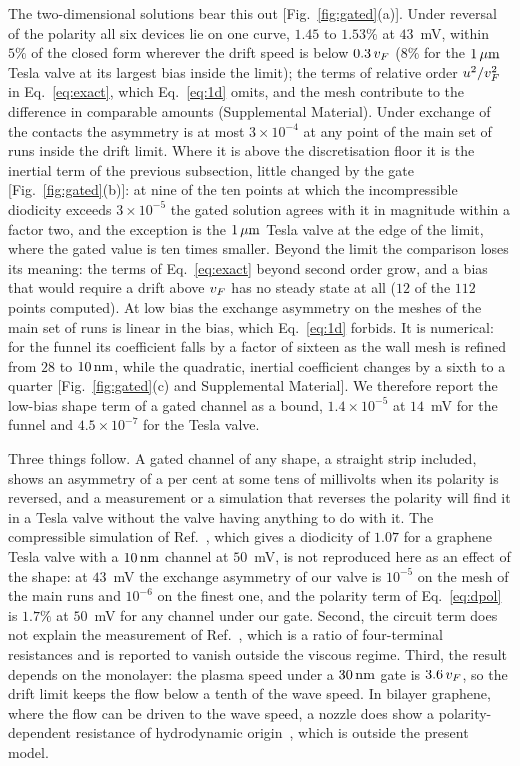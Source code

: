 The two-dimensional solutions bear this out
[Fig.~\ref{fig:gated}(a)]. Under reversal of the polarity all six devices
lie on one curve, $1.45$ to $1.53\%$ at $43$~mV, within $5\%$ of the closed form
wherever the drift speed is below $0.3\,v_{F}$ ($8\%$ for the $1\,\mu\mathrm{m}$ Tesla
valve at its largest bias inside the limit); the terms of relative order
$u^{2}/v_{F}^{2}$ in Eq.~\eqref{eq:exact}, which Eq.~\eqref{eq:1d} omits, and
the mesh contribute to the difference in comparable amounts (Supplemental
Material). Under exchange of the
contacts the asymmetry is at most $3\times10^{-4}$ at any point of the main set of runs
inside the drift limit. Where it is above the discretisation
floor it is the
inertial term of the previous subsection, little changed by the gate
[Fig.~\ref{fig:gated}(b)]: at nine of the ten
points at which the
incompressible diodicity exceeds $3\times10^{-5}$ the gated solution agrees with
it in magnitude within a factor two, and the exception is the $1\,\mu\mathrm{m}$ Tesla valve at the edge of the
limit, where the gated value is ten times smaller. Beyond the limit the
comparison loses its meaning: the terms of Eq.~\eqref{eq:exact} beyond
second order grow, and a bias that would require a drift above $v_{F}$ has no
steady state at all ($12$ of the $112$ points computed). At low bias the exchange asymmetry on the meshes of the main set of runs is
linear in the bias, which Eq.~\eqref{eq:1d} forbids. It is numerical: for
the funnel its coefficient falls by a factor of sixteen as the wall mesh
is refined from $28$ to $10\,\mathrm{nm}$, while the quadratic, inertial coefficient
changes by a sixth to a quarter [Fig.~\ref{fig:gated}(c) and Supplemental
Material]. We therefore report the low-bias
shape term of a gated channel as a bound, $1.4\times10^{-5}$ at $14$~mV for
the funnel and $4.5\times10^{-7}$ for the Tesla valve.

Three things follow. A gated channel of any shape, a straight strip
included, shows an asymmetry of a per cent at some tens of millivolts when
its polarity is reversed, and a measurement or a simulation that reverses
the polarity will find it in a Tesla valve without the valve having
anything to do with it. The compressible simulation of
Ref.~\cite{gungor2022modeling}, which gives a diodicity of $1.07$ for a
graphene Tesla valve with a $10\,\mathrm{nm}$ channel at $50$~mV, is not reproduced
here as an effect of the shape: at $43$~mV the exchange asymmetry of our
valve is $10^{-5}$ on the mesh of the main runs and $10^{-6}$ on the finest
one, and the polarity term of Eq.~\eqref{eq:dpol} is
$1.7\%$ at $50$~mV for any channel under our gate. Second, the circuit term does not explain the measurement of
Ref.~\cite{geurs2020rectification}, which is a ratio of four-terminal
resistances and is reported to vanish outside the viscous regime. Third, the
result depends on the monolayer: the plasma speed under a $30\,\mathrm{nm}$ gate is
$3.6\,v_{F}$, so the drift limit keeps the flow below a tenth of the wave
speed. In bilayer graphene, where the flow can be driven to the wave
speed, a nozzle does show a polarity-dependent resistance of hydrodynamic
origin~\cite{geurs2025supersonic}, which is outside the present model.

